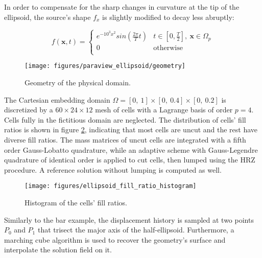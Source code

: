 In order to compensate for the sharp changes in curvature at the tip of the ellipsoid, the source's shape $f_x$ is slightly modified to decay less abruptly:

\begin{equation} \label{eq:ellipsoid_source}
f(\mathbf x,t) = \begin{cases}
e^{-10^3x^2} sin \left( \frac{2 \pi}{T} t \right) & t \in \left[ 0,\frac{T}{2} \right], \ \mathbf x \in \Omega_p \\[0.5em]
0 & \text{otherwise} \\
\end{cases}
\end{equation}

\begin{figure}[!h]
	\centering
	\hspace*{3cm}\texttt{[image: figures/paraview\_ellipsoid/geometry]}
	\caption{Geometry of the physical domain.}
	\label{ref:ellipsoid_geometry}
\end{figure}

The Cartesian embedding domain $\Omega = [0, \ 1] \times [0, \ 0.4] \times [0, \ 0.2]$ is discretized by a $60 \times  24 \times 12$ mesh of cells with a Lagrange basis of order $p=4$. Cells fully in the fictitious domain are neglected. The distribution of cells' fill ratios is shown in figure \ref{fig:ellipsoid_fill_ratio_histogram}, indicating that most cells are uncut and the rest have diverse fill ratios. The mass matrices of uncut cells are integrated with a fifth order Gauss-Lobatto quadrature, while an adaptive scheme with Gauss-Legendre quadrature of identical order is applied to cut cells, then lumped using the HRZ procedure. A reference solution without lumping is computed as well.

\begin{figure}[!h]
	\centering
	\texttt{[image: figures/ellipsoid\_fill\_ratio\_histogram]}
	\caption{Histogram of the cells' fill ratios.}
	\label{fig:ellipsoid_fill_ratio_histogram}
\end{figure}

Similarly to the bar example, the displacement history is sampled at two points $P_0$ and $P_1$ that trisect the major axis of the half-ellipsoid. Furthermore, a marching cube algorithm is used to recover the geometry's surface and interpolate the solution field on it.

